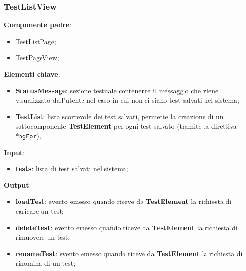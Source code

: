\subsubsection{TestListView}
\textbf{Componente padre}:
\begin{itemize}
    \item TestListPage;
    \item TestPageView;
\end{itemize}
\textbf{Elementi chiave}:
\begin{itemize}
    \item \textbf{StatusMessage}: sezione testuale contenente il messaggio che viene visualizzato dall'utente nel caso in cui non ci siano test salvati nel sistema;
    \item \textbf{TestList}: lista scorrevole dei test salvati, permette la creazione di un sottocomponente \textbf{TestElement} per ogni test salvato (tramite la direttiva *\texttt{ngFor});
\end{itemize}
\textbf{Input}:
\begin{itemize}
    \item \textbf{tests}: lista di test salvati nel sistema;
\end{itemize}
\textbf{Output}:
\begin{itemize}
    \item \textbf{loadTest}: evento emesso quando riceve da \textbf{TestElement} la richiesta di caricare un test;
    \item \textbf{deleteTest}: evento emesso quando riceve da \textbf{TestElement} la richiesta di rimuovere un test;
    \item \textbf{renameTest}: evento emesso quando riceve da \textbf{TestElement} la richiesta di rinomina di un test;
\end{itemize}
